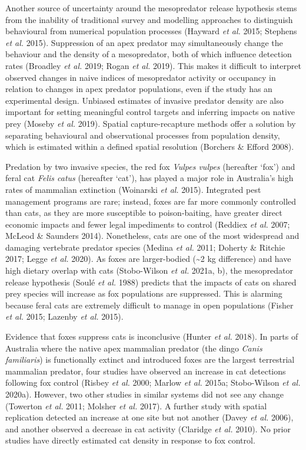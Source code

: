 \documentclass[11pt,a4paper,titlepage,twoside,openright]{style/unimelbthesis}
\begin{document}
\begin{mainmatter}
Another source of uncertainty around the mesopredator release hypothesis stems from the inability of traditional survey and modelling approaches to distinguish behavioural from numerical population processes (Hayward \emph{et al.} 2015; Stephens \emph{et al.} 2015). Suppression of an apex predator may simultaneously change the behaviour and the density of a mesopredator, both of which influence detection rates (Broadley \emph{et al.} 2019; Rogan \emph{et al.} 2019). This makes it difficult to interpret observed changes in naive indices of mesopredator activity or occupancy in relation to changes in apex predator populations, even if the study has an experimental design. Unbiased estimates of invasive predator density are also important for setting meaningful control targets and inferring impacts on native prey (Moseby \emph{et al.} 2019). Spatial capture-recapture methods offer a solution by separating behavioural and observational processes from population density, which is estimated within a defined spatial resolution (Borchers \& Efford 2008).

Predation by two invasive species, the red fox \emph{Vulpes vulpes} (hereafter `fox') and feral cat \emph{Felis catus} (hereafter `cat'), has played a major role in Australia's high rates of mammalian extinction (Woinarski \emph{et al.} 2015). Integrated pest management programs are rare; instead, foxes are far more commonly controlled than cats, as they are more susceptible to poison-baiting, have greater direct economic impacts and fewer legal impediments to control (Reddiex \emph{et al.} 2007; McLeod \& Saunders 2014). Nonetheless, cats are one of the most widespread and damaging vertebrate predator species (Medina \emph{et al.} 2011; Doherty \& Ritchie 2017; Legge \emph{et al.} 2020). As foxes are larger-bodied (\textasciitilde2 kg difference) and have high dietary overlap with cats (Stobo-Wilson \emph{et al.} 2021a, b), the mesopredator release hypothesis (Soulé \emph{et al.} 1988) predicts that the impacts of cats on shared prey species will increase as fox populations are suppressed. This is alarming because feral cats are extremely difficult to manage in open populations (Fisher \emph{et al.} 2015; Lazenby \emph{et al.} 2015).

Evidence that foxes suppress cats is inconclusive (Hunter \emph{et al.} 2018). In parts of Australia where the native apex mammalian predator (the dingo \emph{Canis familiaris}) is functionally extinct and introduced foxes are the largest terrestrial mammalian predator, four studies have observed an increase in cat detections following fox control (Risbey \emph{et al.} 2000; Marlow \emph{et al.} 2015a; Stobo-Wilson \emph{et al.} 2020a). However, two other studies in similar systems did not see any change (Towerton \emph{et al.} 2011; Molsher \emph{et al.} 2017). A further study with spatial replication detected an increase at one site but not another (Davey \emph{et al.} 2006), and another observed a decrease in cat activity (Claridge \emph{et al.} 2010). No prior studies have directly estimated cat density in response to fox control.


\end{mainmatter}
\end{document}
